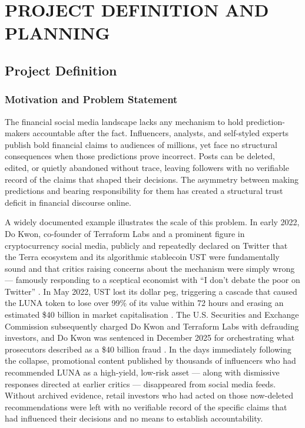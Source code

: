 \documentclass[a4paper,12pt]{report}
\begin{document}
\chapter{PROJECT DEFINITION AND PLANNING}

\section{Project Definition}

\subsection{Motivation and Problem Statement}

The financial social media landscape lacks any mechanism to hold prediction-makers accountable after the fact. Influencers, analysts, and self-styled experts publish bold financial claims to audiences of millions, yet face no structural consequences when those predictions prove incorrect. Posts can be deleted, edited, or quietly abandoned without trace, leaving followers with no verifiable record of the claims that shaped their decisions. The asymmetry between making predictions and bearing responsibility for them has created a structural trust deficit in financial discourse online.

A widely documented example illustrates the scale of this problem. In early 2022, Do Kwon, co-founder of Terraform Labs and a prominent figure in cryptocurrency social media, publicly and repeatedly declared on Twitter that the Terra ecosystem and its algorithmic stablecoin UST were fundamentally sound and that critics raising concerns about the mechanism were simply wrong --- famously responding to a sceptical economist with ``I don't debate the poor on Twitter'' \cite{quiroz2022kwon}. In May 2022, UST lost its dollar peg, triggering a cascade that caused the LUNA token to lose over 99\% of its value within 72 hours and erasing an estimated \$40 billion in market capitalisation \cite{liu2023anatomy}. The U.S. Securities and Exchange Commission subsequently charged Do Kwon and Terraform Labs with defrauding investors, and Do Kwon was sentenced in December 2025 for orchestrating what prosecutors described as a \$40 billion fraud \cite{sec2023kwon, doj2025kwon}. In the days immediately following the collapse, promotional content published by thousands of influencers who had recommended LUNA as a high-yield, low-risk asset --- along with dismissive responses directed at earlier critics --- disappeared from social media feeds. Without archived evidence, retail investors who had acted on those now-deleted recommendations were left with no verifiable record of the specific claims that had influenced their decisions and no means to establish accountability.
\end{document}
